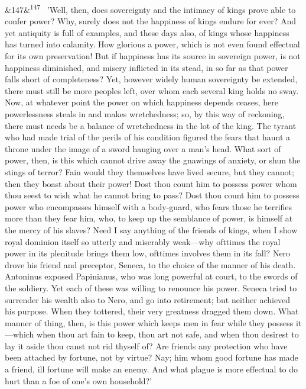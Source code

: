 \documentclass[12pt]{article}
\newcommand{\para}[1][]{\par\noindent\ifx&#1&\else\textsuperscript{\footnotesize #1}~\fi}
\begin{document}
\para[147] 'Well, then, does sovereignty and the intimacy of kings prove able to confer power? Why, surely does not the happiness of kings endure for ever? And yet antiquity is full of examples, and these days also, of kings whose happiness has turned into calamity. How glorious a power, which is not even found effectual for its own preservation! But if happiness has its source in sovereign power, is not happiness diminished, and misery inflicted in its stead, in so far as that power falls short of completeness? Yet, however widely human sovereignty be extended, there must still be more peoples left, over whom each several king holds no sway. Now, at whatever point the power on which happiness depends ceases, here powerlessness steals in and makes wretchedness; so, by this way of reckoning, there must needs be a balance of wretchedness in the lot of the king. The tyrant who had made trial of the perils of his condition figured the fears that haunt a throne under the image of a sword hanging over a man's head. What sort of power, then, is this which cannot drive away the gnawings of anxiety, or shun the stings of terror? Fain would they themselves have lived secure, but they cannot; then they boast about their power! Dost thou count him to possess power whom thou seest to wish what he cannot bring to pass? Dost thou count him to possess power who encompasses himself with a body-guard, who fears those he terrifies more than they fear him, who, to keep up the semblance of power, is himself at the mercy of his slaves? Need I say anything of the friends of kings, when I show royal dominion itself so utterly and miserably weak---why ofttimes the royal power in its plenitude brings them low, ofttimes involves them in its fall? Nero drove his friend and preceptor, Seneca, to the choice of the manner of his death. Antoninus exposed Papinianus, who was long powerful at court, to the swords of the soldiery. Yet each of these was willing to renounce his power. Seneca tried to surrender his wealth also to Nero, and go into retirement; but neither achieved his purpose. When they tottered, their very greatness dragged them down. What manner of thing, then, is this power which keeps men in fear while they possess it---which when thou art fain to keep, thou art not safe, and when thou desirest to lay it aside thou canst not rid thyself of? Are friends any protection who have been attached by fortune, not by virtue? Nay; him whom good fortune has made a friend, ill fortune will make an enemy. And what plague is more effectual to do hurt than a foe of one's own household?'
\end{document}

